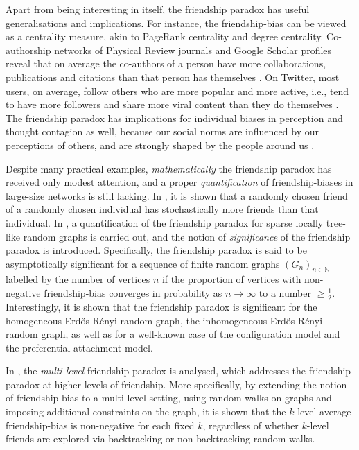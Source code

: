 \documentclass[11pt]{article}
\numberwithin{equation}{section}
\theoremstyle{plain}
\newcommand{\N}{\mathbb N}
\begin{document}
Apart from being interesting in itself, the friendship paradox has useful generalisations and implications. For instance, the friendship-bias can be viewed as a centrality measure, akin to PageRank centrality \cite{PageRank} and degree centrality. Co-authorship networks of Physical Review journals and Google Scholar profiles reveal that on average the co-authors of a person have more collaborations, publications and citations than that person has themselves \cite{EomJo}. On Twitter, most users, on average, follow others who are more popular and more active, i.e., tend to have more followers and share more viral content than they do themselves \cite{HKK}. The friendship paradox has implications for individual biases in perception and thought contagion as well, because our social norms are influenced by our perceptions of others, and are strongly shaped by the people around us \cite{Jackson, Lerman}. 

Despite many practical examples, \emph{mathematically} the friendship paradox has received only modest attention, and a proper \emph{quantification} of friendship-biases in large-size networks is still lacking. In \cite{CR}, it is shown that a randomly chosen friend of a randomly chosen individual has stochastically more friends than that individual. In \cite{HHP1}, a quantification of the friendship paradox for sparse locally tree-like random graphs is carried out, and the notion of \emph{significance} of the friendship paradox is introduced. Specifically, the friendship paradox is said to be asymptotically significant for a sequence of finite random graphs $(G_n)_{n\in\N}$ labelled by the number of vertices $n$ if the proportion of vertices with non-negative friendship-bias converges in probability as $n\to\infty$ to a number $\geq \tfrac{1}{2}$. Interestingly, it is shown that the friendship paradox is significant for the homogeneous Erd\H{o}s-R\'enyi random graph, the inhomogeneous Erd\H{o}s-R\'enyi random graph, as well as for a well-known case of the configuration model and the preferential attachment model. 

In \cite{HHP2}, the \emph{multi-level} friendship paradox is analysed, which addresses the friendship paradox at higher levels of friendship. More specifically, by extending the notion of friendship-bias to a multi-level setting, using random walks on graphs and imposing additional constraints on the graph, it is shown that the $k$-level average friendship-bias is non-negative for each fixed $k$, regardless of whether $k$-level friends are explored via backtracking or non-backtracking random walks.
 
\end{document}
